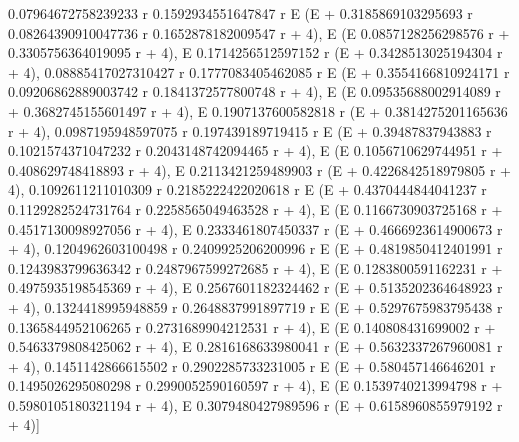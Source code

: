 \documentclass{article}
\begin{document}
     0.07964672758239233 r   0.1592934551647847 r
    E                      (E                     + 0.3185869103295693 r
            0.08264390910047736 r   0.1652878182009547 r
     + 4), E                      (E
                                   0.0857128256298576 r
     + 0.3305756364019095 r + 4), E
       0.1714256512597152 r
     (E                     + 0.3428513025194304 r + 4), 
     0.08885417027310427 r   0.1777083405462085 r
    E                      (E                     + 0.3554166810924171 r
            0.09206862889003742 r   0.1841372577800748 r
     + 4), E                      (E
                                   0.09535688002914089 r
     + 0.3682745155601497 r + 4), E
       0.1907137600582818 r
     (E                     + 0.3814275201165636 r + 4), 
     0.0987195948597075 r   0.197439189719415 r
    E                     (E                    + 0.39487837943883 r
            0.1021574371047232 r   0.2043148742094465 r
     + 4), E                     (E
                                  0.1056710629744951 r
     + 0.408629748418893 r + 4), E
       0.2113421259489903 r
     (E                     + 0.4226842518979805 r + 4), 
     0.1092611211010309 r   0.2185222422020618 r
    E                     (E                     + 0.4370444844041237 r
            0.1129282524731764 r   0.2258565049463528 r
     + 4), E                     (E
                                   0.1166730903725168 r
     + 0.4517130098927056 r + 4), E
       0.2333461807450337 r
     (E                     + 0.4666923614900673 r + 4), 
     0.1204962603100498 r   0.2409925206200996 r
    E                     (E                     + 0.4819850412401991 r
            0.1243983799636342 r   0.2487967599272685 r
     + 4), E                     (E
                                   0.1283800591162231 r
     + 0.4975935198545369 r + 4), E
       0.2567601182324462 r
     (E                     + 0.5135202364648923 r + 4), 
     0.1324418995948859 r   0.2648837991897719 r
    E                     (E                     + 0.5297675983795438 r
            0.1365844952106265 r   0.2731689904212531 r
     + 4), E                     (E
                                   0.140808431699002 r
     + 0.5463379808425062 r + 4), E
       0.2816168633980041 r
     (E                     + 0.5632337267960081 r + 4), 
     0.1451142866615502 r   0.2902285733231005 r
    E                     (E                     + 0.580457146646201 r
            0.1495026295080298 r   0.2990052590160597 r
     + 4), E                     (E
                                   0.1539740213994798 r
     + 0.5980105180321194 r + 4), E
       0.3079480427989596 r
     (E                     + 0.6158960855979192 r + 4)]
    
\end{document}
